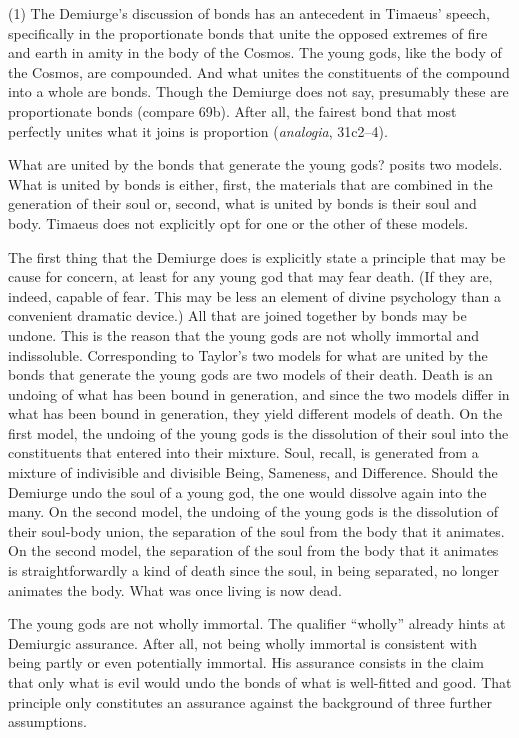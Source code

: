 (1) The Demiurge's discussion of bonds has an antecedent in Timaeus' speech, specifically in the proportionate bonds that unite the opposed extremes of fire and earth in amity in the body of the Cosmos. The young gods, like the body of the Cosmos, are compounded. And what unites the constituents of the compound into a whole are bonds. Though the Demiurge does not say, presumably these are proportionate bonds (compare 69b). After all, the fairest bond that most perfectly unites what it joins is proportion (\emph{analogia}, 31c2--4). 

What are united by the bonds that generate the young gods? \citet[]{Taylor:1928qb} posits two models. What is united by bonds is either, first, the materials that are combined in the generation of their soul or, second, what is united by bonds is their soul and body. Timaeus does not explicitly opt for one or the other of these models.

The first thing that the Demiurge does is explicitly state a principle that may be cause for concern, at least for any young god that may fear death. (If they are, indeed, capable of fear. This may be less an element of divine psychology than a convenient dramatic device.) All that are joined together by bonds may be undone. This is the reason that the young gods are not wholly immortal and indissoluble. Corresponding to Taylor's two models for what are united by the bonds that generate the young gods are two models of their death. Death is an undoing of what has been bound in generation, and since the two models differ in what has been bound in generation, they yield different models of death. On the first model, the undoing of the young gods is the dissolution of their soul into the constituents that entered into their mixture. Soul, recall, is generated from a mixture of indivisible and divisible Being, Sameness, and Difference. Should the Demiurge undo the soul of a young god, the one would dissolve again into the many. On the second model, the undoing of the young gods is the dissolution of their soul-body union, the separation of the soul from the body that it animates. On the second model, the separation of the soul from the body that it animates is straightforwardly a kind of death since the soul, in being separated, no longer animates the body. What was once living is now dead. 

The young gods are not wholly immortal. The qualifier ``wholly'' already hints at Demiurgic assurance. After all, not being wholly immortal is consistent with being partly or even potentially immortal. His assurance consists in the claim that only what is evil would undo the bonds of what is well-fitted and good. That principle only constitutes an assurance against the background of three further assumptions. 

